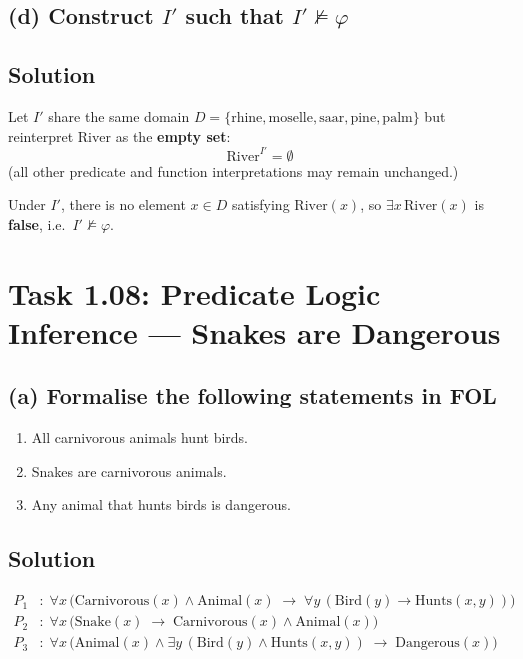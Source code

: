 \documentclass[11pt,a4paper]{article}
\newenvironment{solution}{%
	\begin{tcolorbox}[
		breakable,
		colback=green!4,
		colframe=green!50!black,
		fonttitle=\bfseries,
		title={ Solution},
		left=6pt, right=6pt, top=4pt, bottom=4pt
		]%
	}{%
	\end{tcolorbox}%
}
\begin{document}
\subsection*{(d) Construct $I'$ such that $I' \not\models \varphi$}

\subsection*{Solution}
\begin{solution}
Let $I'$ share the same domain $D = \{\text{rhine},\text{moselle},\text{saar},\text{pine},\text{palm}\}$ but reinterpret $\mathrm{River}$ as the \textbf{empty set}:
\[
\mathrm{River}^{I'} = \emptyset
\]
(all other predicate and function interpretations may remain unchanged.)

Under $I'$, there is no element $x \in D$ satisfying $\mathrm{River}(x)$, so $\exists x\,\mathrm{River}(x)$ is \textbf{false}, i.e.\ $I' \not\models \varphi$.
\end{solution}

\section*{Task 1.08: Predicate Logic Inference — Snakes are Dangerous}

\subsection*{(a) Formalise the following statements in FOL}

\begin{enumerate}
	\item All carnivorous animals hunt birds.
	\item Snakes are carnivorous animals.
	\item Any animal that hunts birds is dangerous.
\end{enumerate}

\subsection*{Solution}
\begin{solution}
\begin{align}
P_1 &:\; \forall x\,\bigl(\mathrm{Carnivorous}(x) \land \mathrm{Animal}(x)
          \;\to\; \forall y\,(\mathrm{Bird}(y) \to \mathrm{Hunts}(x,y))\bigr) \tag{1}\\[4pt]
P_2 &:\; \forall x\,\bigl(\mathrm{Snake}(x)
          \;\to\; \mathrm{Carnivorous}(x) \land \mathrm{Animal}(x)\bigr) \tag{2}\\[4pt]
P_3 &:\; \forall x\,\bigl(\mathrm{Animal}(x) \land \exists y\,(\mathrm{Bird}(y) \land \mathrm{Hunts}(x,y))
          \;\to\; \mathrm{Dangerous}(x)\bigr) \tag{3}
\end{align}
\end{solution}
\end{document}
